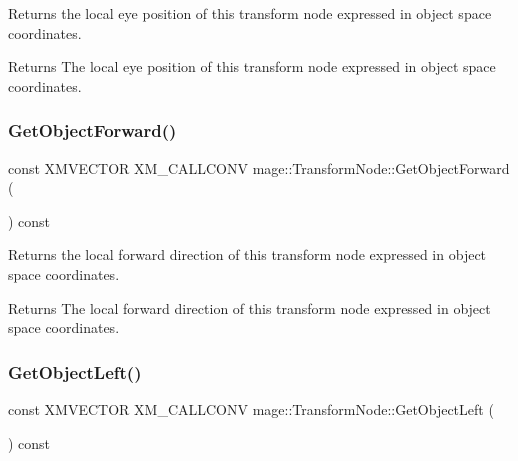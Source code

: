Returns the local eye position of this transform node expressed in object space coordinates.

\begin{DoxyReturn}{Returns}
The local eye position of this transform node expressed in object space coordinates. 
\end{DoxyReturn}
\hypertarget{classmage_1_1_transform_node_ac59bd5c73cf6344a34bdf4f2d9cbc392}{}\label{classmage_1_1_transform_node_ac59bd5c73cf6344a34bdf4f2d9cbc392} 
\subsubsection{\texorpdfstring{Get\+Object\+Forward()}{GetObjectForward()}}
{\footnotesize\ttfamily const X\+M\+V\+E\+C\+T\+OR X\+M\+\_\+\+C\+A\+L\+L\+C\+O\+NV mage\+::\+Transform\+Node\+::\+Get\+Object\+Forward (\begin{DoxyParamCaption}{ }\end{DoxyParamCaption}) const\hspace{0.3cm}{\ttfamily [noexcept]}}

Returns the local forward direction of this transform node expressed in object space coordinates.

\begin{DoxyReturn}{Returns}
The local forward direction of this transform node expressed in object space coordinates. 
\end{DoxyReturn}
\hypertarget{classmage_1_1_transform_node_a88263e8746d271601c693b200f8bf1f2}{}\label{classmage_1_1_transform_node_a88263e8746d271601c693b200f8bf1f2} 
\subsubsection{\texorpdfstring{Get\+Object\+Left()}{GetObjectLeft()}}
{\footnotesize\ttfamily const X\+M\+V\+E\+C\+T\+OR X\+M\+\_\+\+C\+A\+L\+L\+C\+O\+NV mage\+::\+Transform\+Node\+::\+Get\+Object\+Left (\begin{DoxyParamCaption}{ }\end{DoxyParamCaption}) const\hspace{0.3cm}{\ttfamily [noexcept]}}

